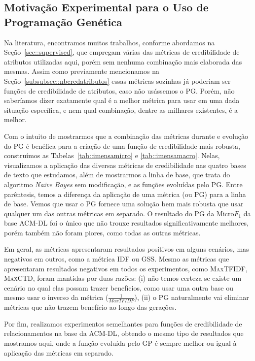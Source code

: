\subsection{Motivação Experimental para o Uso de Programação Genética}
\label{subsec::ganhosgp}

Na literatura, encontramos muitos trabalhos, conforme abordamos na Seção~\ref{sec::supervised}, que empregam várias das métricas de credibilidade de atributos utilizadas aqui, porém sem nenhuma combinação mais elaborada das mesmas. 
Assim como previamente mencionamos na Seção~\ref{subsubsec::nbcredatributos} essas métricas sozinhas já poderiam ser funções de credibilidade de atributos, caso não usássemos o \textsc{PG}. Porém, não saberíamos dizer exatamente qual é a melhor métrica para usar em uma dada situação específica, e nem qual combinação, dentre as milhares existentes, é a melhor. 

Com o intuito de mostrarmos que a combinação das métricas durante e evolução do \textsc{PG} é benéfica para a criação de uma função de credibilidade mais robusta, construímos as Tabelas~\ref{tab::imensamicro} e \ref{tab::imensamacro}. 
Nelas, visualizamos a aplicação das diversas métricas de credibilidade nas quatro bases de texto que estudamos, além de mostrarmos a linha de base, que trata do algoritmo \textit{Naïve Bayes} sem modificação, e as funções evoluídas pelo \textsc{PG}. Entre parêntesis, temos a diferença da aplicação de uma métrica (ou \textsc{PG}) para a linha de base.
Vemos que usar o \textsc{PG} fornece uma solução bem mais robusta que usar qualquer um das outras métricas em separado. O resultado do \textsc{PG} da Micro$F_1$ da base \textsc{ACM-DL} foi o único que não trouxe resultados significativamente melhores, porém também não foram piores, como todas as outras métricas.

Em geral, as métricas apresentaram resultados positivos em alguns cenários, mas negativos em outros, como a métrica \textsc{IDF} ou \textsc{GSS}. Mesmo as métricas que apresentaram resultados negativos em todos os experimentos, como \textsc{MaxTFIDF}, \textsc{MaxCTD}, foram mantidas por duas razões: (i) não temos certeza se existe um cenário no qual elas possam trazer benefícios, como usar uma outra base ou mesmo usar o inverso da métrica ($\frac{1}{MaxTFIDF}$), (ii) o \textsc{PG} naturalmente vai eliminar métricas que não trazem benefício ao longo das gerações. 

Por fim, realizamos experimentos semelhantes para funções de credibilidade de relacionamentos na base da \textsc{ACM-DL}, obtendo o mesmo tipo de resultados que mostramos aqui, onde a função evoluída pelo \textsc{GP} é sempre melhor ou igual à aplicação das métricas em separado.

